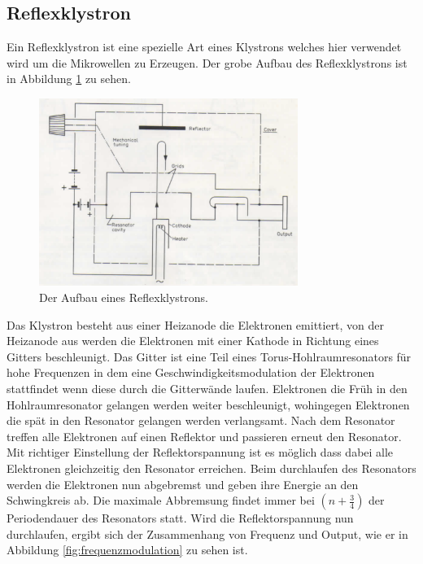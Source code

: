     \subsection{Reflexklystron}
    \label{sec:Reflexklystron}
        Ein Reflexklystron ist eine spezielle Art eines Klystrons welches hier verwendet wird um die Mikrowellen zu Erzeugen.
        Der grobe Aufbau des Reflexklystrons ist in Abbildung \ref{fig:reflexklystron} zu sehen.
        \begin{figure}
            \centering
            \includegraphics[width = 0.75\textwidth]{bilder/Reflexklystron.png}
            \caption{Der Aufbau eines Reflexklystrons.}
            \label{fig:reflexklystron}
        \end{figure}
        Das Klystron besteht aus einer Heizanode die Elektronen emittiert, von der Heizanode aus werden die Elektronen mit einer Kathode in Richtung eines Gitters beschleunigt.
        Das Gitter ist eine Teil eines Torus-Hohlraumresonators für hohe Frequenzen in dem eine Geschwindigkeitsmodulation der Elektronen stattfindet wenn diese durch die Gitterwände laufen.
        Elektronen die Früh in den Hohlraumresonator gelangen werden weiter beschleunigt, wohingegen Elektronen die spät in den Resonator gelangen werden verlangsamt. Nach dem Resonator treffen alle Elektronen auf einen Reflektor und passieren erneut den Resonator.
        Mit richtiger Einstellung der Reflektorspannung ist es möglich dass dabei alle Elektronen gleichzeitig den Resonator erreichen.
        Beim durchlaufen des Resonators werden die Elektronen nun abgebremst und geben ihre Energie an den Schwingkreis ab. Die maximale Abbremsung findet immer bei $(n + \frac{3}{4})$ der Periodendauer des Resonators statt.
        Wird die Reflektorspannung nun durchlaufen, ergibt sich der Zusammenhang von Frequenz und Output, wie er in Abbildung \ref{fig:frequenzmodulation} zu sehen ist.
